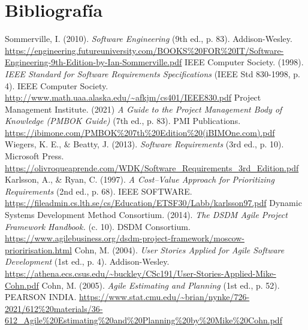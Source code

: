 \section*{Bibliografía}

\begin{thebibliography}{99}
Sommerville, I. (2010).
\textit{Software Engineering} (9th ed., p. 83).
Addison-Wesley.
\url{https://engineering.futureuniversity.com/BOOKS%20FOR%20IT/Software-Engineering-9th-Edition-by-Ian-Sommerville.pdf}
IEEE Computer Society. (1998).
\textit{IEEE Standard for Software Requirements Specifications} (IEEE Std 830-1998, p. 4).
IEEE Computer Society.
\url{http://www.math.uaa.alaska.edu/~afkjm/cs401/IEEE830.pdf}
Project Management Institute. (2021)
\textit{A Guide to the Project Management Body of Knowledge (PMBOK Guide)} (7th ed., p. 83).
PMI Publications.
\url{https://ibimone.com/PMBOK%207th%20Edition%20(iBIMOne.com).pdf}
Wiegers, K. E., \& Beatty, J. (2013).
\textit{Software Requirements} (3rd ed., p. 10).
Microsoft Press.
\url{https://olivroqueaprende.com/WDK/Software_Requirements_3rd_Edition.pdf}
Karlsson, A., \& Ryan, C. (1997).
\textit{A Cost–Value Approach for Prioritizing Requirements} (2nd ed., p. 68).
IEEE SOFTWARE.
\url{https://fileadmin.cs.lth.se/cs/Education/ETSF30/Labb/karlsson97.pdf}
Dynamic Systems Development Method Consortium. (2014).
\textit{The DSDM Agile Project Framework Handbook.} (c. 10).
DSDM Consortium.
\url{https://www.agilebusiness.org/dsdm-project-framework/moscow-prioririsation.html}
Cohn, M. (2004).
\textit{User Stories Applied for Agile Software Development} (1st ed., p. 4).
Addison-Wesley.
\url{https://athena.ecs.csus.edu/~buckley/CSc191/User-Stories-Applied-Mike-Cohn.pdf}
Cohn, M. (2005).
\textit{Agile Estimating and Planning} (1st ed., p. 52).
PEARSON INDIA.
\url{https://www.stat.cmu.edu/~brian/nynke/726-2021/612%20materials/36-612_Agile%20Estimating%20and%20Planning%20by%20Mike%20Cohn.pdf}
\end{thebibliography}